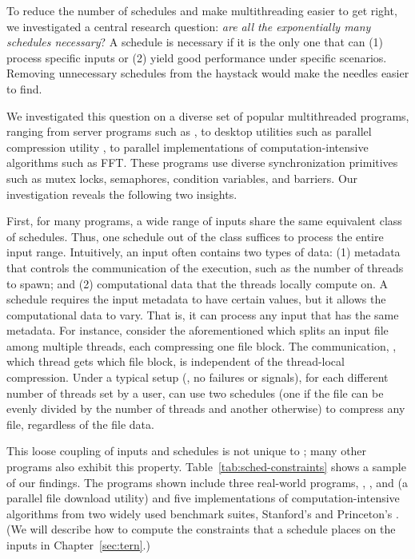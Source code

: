 To reduce the number of schedules and make multithreading easier to get right,
we investigated a central research question: \emph{are all the exponentially
many schedules necessary}?  A schedule is necessary if it is the only one
that can (1) process specific inputs or (2) yield good performance under
specific scenarios. Removing unnecessary schedules from the haystack would
make the needles easier to find.

We investigated this question on a diverse set of popular multithreaded
programs, ranging from server programs such as \apache, to desktop utilities
such as parallel compression utility \pbzip, to parallel implementations of
computation-intensive algorithms such as FFT.  These programs use diverse
synchronization primitives such as mutex locks, semaphores, condition variables,
and barriers.  Our investigation reveals the following two insights.

First, for many programs, a wide range of inputs share the same equivalent
class of schedules.  Thus, one schedule out of the class suffices to
process the entire input range.  Intuitively, an input often contains two
types of data: (1) metadata that controls the communication of the
execution, such as the number of threads to spawn; and (2) computational
data that the threads locally compute on.  A schedule requires the input
metadata to have certain values, but it allows the computational data to vary.
That is, it can process any input that has the same metadata.  For instance,
consider the aforementioned \pbzip which splits an input file
among multiple threads, each compressing one file block.  The
communication, \ie, which thread gets which file block, is independent of
the thread-local compression. Under a typical setup (\eg, no 
failures or signals), for each different number of threads set by a user, \pbzip
can use two schedules (one if the file can be evenly divided by the number of
threads and another otherwise) to compress any file, regardless of the file
data.

This loose coupling of inputs and schedules is not unique to \pbzip; many
other programs also exhibit this property.
Table~\ref{tab:sched-constraints} shows a sample of our findings.  The
programs shown include three real-world programs, \apache, \pbzip, and
\aget (a parallel file download utility) and five implementations of
computation-intensive algorithms from two widely used benchmark suites,
Stanford's \splash and Princeton's \parsec. (We will describe
how to compute the constraints that a schedule places on the inputs in
Chapter~\ref{sec:tern}.)

